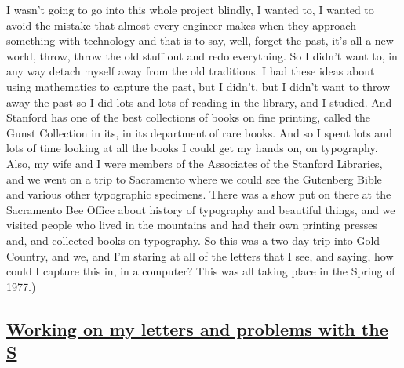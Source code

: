 \documentclass[]{article}
\begin{document}
I wasn't going to go into this whole project blindly, I wanted to, I
wanted to avoid the mistake that almost every engineer makes when they
approach something with technology and that is to say, well, forget the
past, it's all a new world, throw, throw the old stuff out and redo
everything. So I didn't want to, in any way detach myself away from the
old traditions. I had these ideas about using mathematics to capture the
past, but I didn't, but I didn't want to throw away the past so I did
lots and lots of reading in the library, and I studied. And Stanford has
one of the best collections of books on fine printing, called the Gunst
Collection in its, in its department of rare books. And so I spent lots
and lots of time looking at all the books I could get my hands on, on
typography. Also, my wife and I were members of the Associates of the
Stanford Libraries, and we went on a trip to Sacramento where we could
see the Gutenberg Bible and various other typographic specimens. There
was a show put on there at the Sacramento Bee Office about history of
typography and beautiful things, and we visited people who lived in the
mountains and had their own printing presses and, and collected books on
typography. So this was a two day trip into Gold Country, and we, and
I'm staring at all of the letters that I see, and saying, how could I
capture this in, in a computer? This was all taking place in the Spring
of 1977.)

\subsection{\texorpdfstring{\href{http://webofstories.com/play/17114}{Working
on my letters and problems with the
S}}{Working on my letters and problems with the S}}\label{working-on-my-letters-and-problems-with-the-s}
\end{document}
